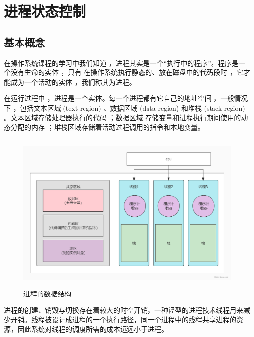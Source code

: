 \section{进程状态控制}

\subsection{基本概念}

在操作系统课程的学习中我们知道 ，进程其实是一个“执行中的程序”。程序是一个没有生命的实体 ，只有 在操作系统执行静态的、放在磁盘中的代码段时 ，它才能成为一个活动的实体 ，我们称其为进程。

在运行过程中 ，进程是一个实体。每一个进程都有它自己的地址空间 ，一般情况下 ，包括文本区域  (text  region)  、数据区域  (data region)  和堆栈  (stack region)  。文本区域存储处理器执行的代码 ；数据区域 存储变量和进程执行期间使用的动态分配的内存 ；堆栈区域存储着活动过程调用的指令和本地变量。
\begin{figure}[H]
	\centering
	\includegraphics[width=14cm,height=8cm]{figures/04-02-01-进程的数据结构.png}
	\caption{进程的数据结构}
\end{figure}  

进程的创建、销毁与切换存在着较大的时空开销，一种轻型的进程技术线程用来减少开销。线程被设计成进程的一个执行路径，同一个进程中的线程共享进程的资源，因此系统对线程的调度所需的成本远远小于进程。

